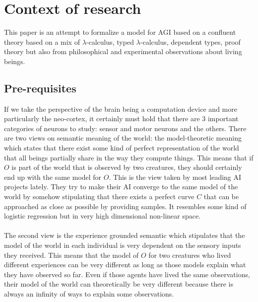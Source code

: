 \section{Context of research}

This paper is an attempt to formalize a model for AGI based on a confluent theory based on a mix of $\lambda$-calculus, typed $\lambda$-calculus, dependent types, proof theory but also from philosophical and experimental observations about living beings.

\subsection{Pre-requisites}

If we take the perspective of the brain being a computation device and more particularly the neo-cortex, it certainly must hold that there are 3 important categories of neurons to study: sensor and motor neurons and the others. There are two views on semantic meaning of the world: the model-theoretic meaning which states that there exist some kind of perfect representation of the world that all beings partially share in the way they compute things. This means that if $O$ is part of the world that is observed by two creatures, they should certainly end up with the same model for $O$. This is the view taken by most leading AI projects lately. They try to make their AI converge to the same model of the world by somehow stipulating that there exists a perfect curve $C$ that can be approached as close as possible by providing samples. It resembles some kind of logistic regression but in very high dimensional non-linear space.\\
\\
The second view is the experience grounded semantic which stipulates that the model of the world in each individual is very dependent on the sensory inputs they received. This means that the model of $O$ for two creatures who lived different experiences can be very different as long as those models explain what they have observed so far. Even if those agents have lived the same observations, their model of the world can theoretically be very different because there is always an infinity of ways to explain some observations.\\
\\
